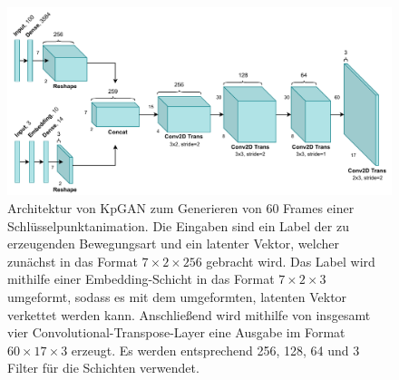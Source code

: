 \begin{figure}
    \includegraphics[width=\textwidth]{images/KpGAN.pdf}
    \caption{Architektur von KpGAN zum Generieren von 60 Frames einer
      Schlüs\-sel\-punkt\-anima\-tion. Die Eingaben sind ein Label der zu
      erzeugenden Bewegungsart und ein latenter Vektor, welcher zunächst in das Format $7
      \times 2 \times 256$ gebracht wird. Das Label wird mithilfe einer
      Embedding-Schicht in das Format $7 \times 2 \times 3$ umgeformt, sodass es
      mit dem umgeformten, latenten Vektor verkettet werden kann. Anschließend
    wird mithilfe von insgesamt vier Convolutional-Transpose-Layer eine Ausgabe
  im Format $60 \times 17 \times 3$ erzeugt. Es werden entsprechend 256, 128, 64
und 3 Filter für die Schichten verwendet.}
    \label{fig:kpgan}
\end{figure}
